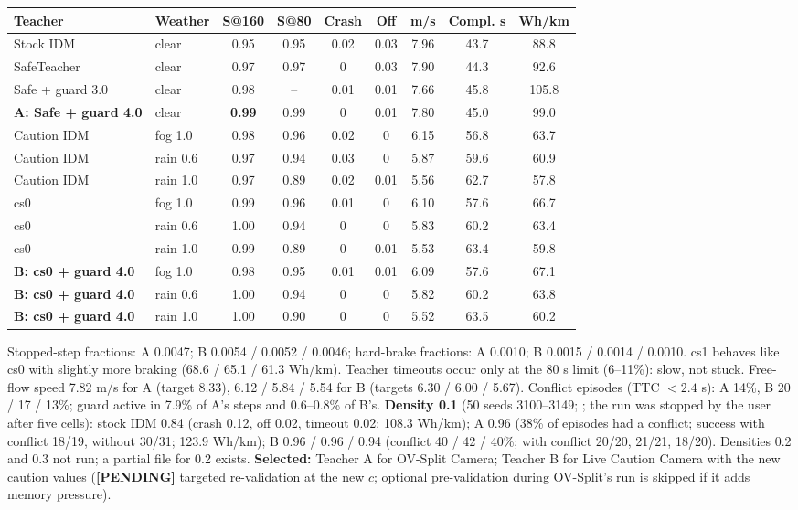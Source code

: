 \documentclass[10.5pt,a4paper]{article}
\newcommand{\code}[1]{\texttt{\detokenize{#1}}}
\newcommand{\tbd}{\textbf{[PENDING]}}
\begin{document}
\begin{center}\footnotesize\setlength{\tabcolsep}{3pt}\begin{tabular}{@{}llccccccc@{}}\toprule
Teacher & Weather & S@160 & S@80 & Crash & Off & m/s & Compl. s & Wh/km\\\midrule
Stock IDM & clear & 0.95 & 0.95 & 0.02 & 0.03 & 7.96 & 43.7 & 88.8\\
SafeTeacher & clear & 0.97 & 0.97 & 0 & 0.03 & 7.90 & 44.3 & 92.6\\
Safe + guard 3.0 & clear & 0.98 & -- & 0.01 & 0.01 & 7.66 & 45.8 & 105.8\\
\textbf{A: Safe + guard 4.0} & clear & \textbf{0.99} & 0.99 & 0 & 0.01 & 7.80 & 45.0 & 99.0\\
Caution IDM & fog 1.0 & 0.98 & 0.96 & 0.02 & 0 & 6.15 & 56.8 & 63.7\\
Caution IDM & rain 0.6 & 0.97 & 0.94 & 0.03 & 0 & 5.87 & 59.6 & 60.9\\
Caution IDM & rain 1.0 & 0.97 & 0.89 & 0.02 & 0.01 & 5.56 & 62.7 & 57.8\\
cs0 & fog 1.0 & 0.99 & 0.96 & 0.01 & 0 & 6.10 & 57.6 & 66.7\\
cs0 & rain 0.6 & 1.00 & 0.94 & 0 & 0 & 5.83 & 60.2 & 63.4\\
cs0 & rain 1.0 & 0.99 & 0.89 & 0 & 0.01 & 5.53 & 63.4 & 59.8\\
\textbf{B: cs0 + guard 4.0} & fog 1.0 & 0.98 & 0.95 & 0.01 & 0.01 & 6.09 & 57.6 & 67.1\\
\textbf{B: cs0 + guard 4.0} & rain 0.6 & 1.00 & 0.94 & 0 & 0 & 5.82 & 60.2 & 63.8\\
\textbf{B: cs0 + guard 4.0} & rain 1.0 & 1.00 & 0.90 & 0 & 0 & 5.52 & 63.5 & 60.2\\\bottomrule\end{tabular}\end{center}
Stopped-step fractions: A 0.0047; B 0.0054 / 0.0052 / 0.0046; hard-brake fractions: A 0.0010; B 0.0015 / 0.0014 / 0.0010.
cs1 behaves like cs0 with slightly more braking (68.6 / 65.1 / 61.3 Wh/km). Teacher timeouts occur only at the 80 s limit (6--11\%): slow, not stuck. Free-flow speed 7.82 m/s for A (target 8.33), 6.12 / 5.84 / 5.54 for B (targets 6.30 / 6.00 / 5.67). Conflict episodes (TTC $<2.4$ s): A 14\%, B 20 / 17 / 13\%; guard active in 7.9\% of A's steps and 0.6--0.8\% of B's.
\textbf{Density 0.1} (50 seeds 3100--3149; \code{results/teacher_density/}; the run was stopped by the user after five cells): stock IDM 0.84 (crash 0.12, off 0.02, timeout 0.02; 108.3 Wh/km); A 0.96 (38\% of episodes had a conflict; success with conflict 18/19, without 30/31; 123.9 Wh/km); B 0.96 / 0.96 / 0.94 (conflict 40 / 42 / 40\%; with conflict 20/20, 21/21, 18/20). Densities 0.2 and 0.3 not run; a partial file for 0.2 exists.
\textbf{Selected:} Teacher A for OV-Split Camera; Teacher B for Live Caution Camera with the new caution values (\tbd{} targeted re-validation at the new $c$; optional pre-validation during OV-Split's run is skipped if it adds memory pressure).
\end{document}
